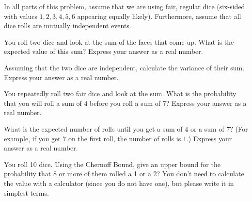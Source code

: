 \documentclass[12pt,oneside]{article}
\begin{document}
\begin{problem}{32}

In all parts of this problem, assume that we are using fair, regular dice (six-sided with values $1, 2, 3, 4, 5, 6$ appearing equally likely).
Furthermore, assume that all dice rolls are mutually independent events.

\bparts
You roll two dice and look at the sum of the faces that come up.  What is the expected value of this sum?  Express your answer as a real number.
\vspace{4 in}

Assuming that the two dice are independent, calculate the variance of their sum.  Express your answer as a real number.
\vspace{4 in}


You repeatedly roll two fair dice and look at the sum. What is the probability that you will roll a sum of $4$ before you roll a sum of $7$? Express your answer as a real number.
\vspace{4 in}

What is the expected number of rolls until you get a sum of $4$ or a sum of $7$?  (For example, if you get $7$ on the first roll, the number of rolls is $1$.) Express your answer as a real number.

\vspace{4 in}

You roll 10 dice.  Using the Chernoff Bound, give an upper bound for the probability that 8 or more of them rolled a 1 or a 2?  You don't need to calculate the value with a 
calculator (since you do not have one), but please write it in simplest terms.



\eparts
\end{problem}

\newpage
\end{document}
